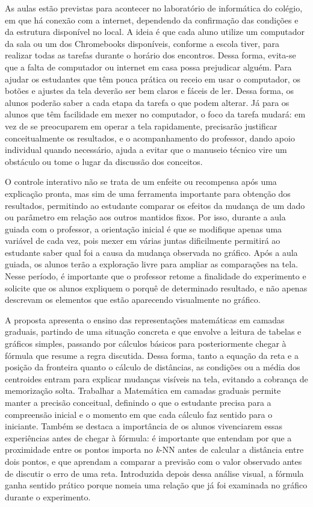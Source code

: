 As aulas estão previstas para acontecer no laboratório de informática do colégio, em que há conexão com a internet, dependendo da confirmação das condições e da estrutura disponível no local. A ideia é que cada aluno utilize um computador da sala ou um dos Chromebooks disponíveis, conforme a escola tiver, para realizar todas as tarefas durante o horário dos encontros. Dessa forma, evita-se que a falta de computador ou internet em casa possa prejudicar alguém. Para ajudar os estudantes que têm pouca prática ou receio em usar o computador, os botões e ajustes da tela deverão ser bem claros e fáceis de ler. Dessa forma, os alunos poderão saber a cada etapa da tarefa o que podem alterar. Já para os alunos que têm facilidade em mexer no computador, o foco da tarefa mudará: em vez de se preocuparem em operar a tela rapidamente, precisarão justificar conceitualmente os resultados, e o acompanhamento do professor, dando apoio individual quando necessário, ajuda a evitar que o manuseio técnico vire um obstáculo ou tome o lugar da discussão dos conceitos.

O controle interativo não se trata de um enfeite ou recompensa após uma explicação pronta, mas sim de uma ferramenta importante para obtenção dos resultados, permitindo ao estudante comparar os efeitos da mudança de um dado ou parâmetro em relação aos outros mantidos fixos. Por isso, durante a aula guiada com o professor, a orientação inicial é que se modifique apenas uma variável de cada vez, pois mexer em várias juntas dificilmente permitirá ao estudante saber qual foi a causa da mudança observada no gráfico. Após a aula guiada, os alunos terão a exploração livre para ampliar as comparações na tela. Nesse período, é importante que o professor retome a finalidade do experimento e solicite que os alunos expliquem o porquê de determinado resultado, e não apenas descrevam os elementos que estão aparecendo visualmente no gráfico.

A proposta apresenta o ensino das representações matemáticas em camadas graduais, partindo de uma situação concreta e que envolve a leitura de tabelas e gráficos simples, passando por cálculos básicos para posteriormente chegar à fórmula que resume a regra discutida. Dessa forma, tanto a equação da reta e a posição da fronteira quanto o cálculo de distâncias, as condições ou a média dos centroides entram para explicar mudanças visíveis na tela, evitando a cobrança de memorização solta. Trabalhar a Matemática em camadas graduais permite manter a precisão conceitual, definindo o que o estudante precisa para a compreensão inicial e o momento em que cada cálculo faz sentido para o iniciante. Também se destaca a importância de os alunos vivenciarem essas experiências antes de chegar à fórmula: é importante que entendam por que a proximidade entre os pontos importa no \textit{k}-NN antes de calcular a distância entre dois pontos, e que aprendam a comparar a previsão com o valor observado antes de discutir o erro de uma reta. Introduzida depois dessa análise visual, a fórmula ganha sentido prático porque nomeia uma relação que já foi examinada no gráfico durante o experimento.

